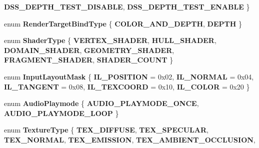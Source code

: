 \begin{DoxyCompactItemize}
{\bfseries D\+S\+S\+\_\+\+D\+E\+P\+T\+H\+\_\+\+T\+E\+S\+T\+\_\+\+D\+I\+S\+A\+B\+LE}, 
{\bfseries D\+S\+S\+\_\+\+D\+E\+P\+T\+H\+\_\+\+T\+E\+S\+T\+\_\+\+E\+N\+A\+B\+LE}
 \}
\item 
\mbox{\label{namespace_blade_a51f1474ac426043fbd780671d4190b12}} 
enum {\bfseries Render\+Target\+Bind\+Type} \{ {\bfseries C\+O\+L\+O\+R\+\_\+\+A\+N\+D\+\_\+\+D\+E\+P\+TH}, 
{\bfseries D\+E\+P\+TH}
 \}
\item 
\mbox{\label{namespace_blade_ad4378fb4853380975f27c32df97c44b7}} 
enum {\bfseries Shader\+Type} \{ \newline
{\bfseries V\+E\+R\+T\+E\+X\+\_\+\+S\+H\+A\+D\+ER}, 
{\bfseries H\+U\+L\+L\+\_\+\+S\+H\+A\+D\+ER}, 
{\bfseries D\+O\+M\+A\+I\+N\+\_\+\+S\+H\+A\+D\+ER}, 
{\bfseries G\+E\+O\+M\+E\+T\+R\+Y\+\_\+\+S\+H\+A\+D\+ER}, 
\newline
{\bfseries F\+R\+A\+G\+M\+E\+N\+T\+\_\+\+S\+H\+A\+D\+ER}, 
{\bfseries S\+H\+A\+D\+E\+R\+\_\+\+C\+O\+U\+NT}
 \}
\item 
\mbox{\label{namespace_blade_ac58f1c7a28a59c0eb6a659b9387f2d23}} 
enum {\bfseries Input\+Layout\+Mask} \{ \newline
{\bfseries I\+L\+\_\+\+P\+O\+S\+I\+T\+I\+ON} = 0x02, 
{\bfseries I\+L\+\_\+\+N\+O\+R\+M\+AL} = 0x04, 
{\bfseries I\+L\+\_\+\+T\+A\+N\+G\+E\+NT} = 0x08, 
{\bfseries I\+L\+\_\+\+T\+E\+X\+C\+O\+O\+RD} = 0x10, 
\newline
{\bfseries I\+L\+\_\+\+C\+O\+L\+OR} = 0x20
 \}
\item 
\mbox{\label{namespace_blade_ade9e5a907d0d8150c597c75e73ccd74a}} 
enum {\bfseries Audio\+Playmode} \{ {\bfseries A\+U\+D\+I\+O\+\_\+\+P\+L\+A\+Y\+M\+O\+D\+E\+\_\+\+O\+N\+CE}, 
{\bfseries A\+U\+D\+I\+O\+\_\+\+P\+L\+A\+Y\+M\+O\+D\+E\+\_\+\+L\+O\+OP}
 \}
\item 
\mbox{\label{namespace_blade_a604b94f1fbd16acf9f04ef07a87afb88}} 
enum {\bfseries Texture\+Type} \{ \newline
{\bfseries T\+E\+X\+\_\+\+D\+I\+F\+F\+U\+SE}, 
{\bfseries T\+E\+X\+\_\+\+S\+P\+E\+C\+U\+L\+AR}, 
{\bfseries T\+E\+X\+\_\+\+N\+O\+R\+M\+AL}, 
{\bfseries T\+E\+X\+\_\+\+E\+M\+I\+S\+S\+I\+ON}, 
\newline
{\bfseries T\+E\+X\+\_\+\+A\+M\+B\+I\+E\+N\+T\+\_\+\+O\+C\+C\+L\+U\+S\+I\+ON}, 

\end{DoxyCompactItemize}
